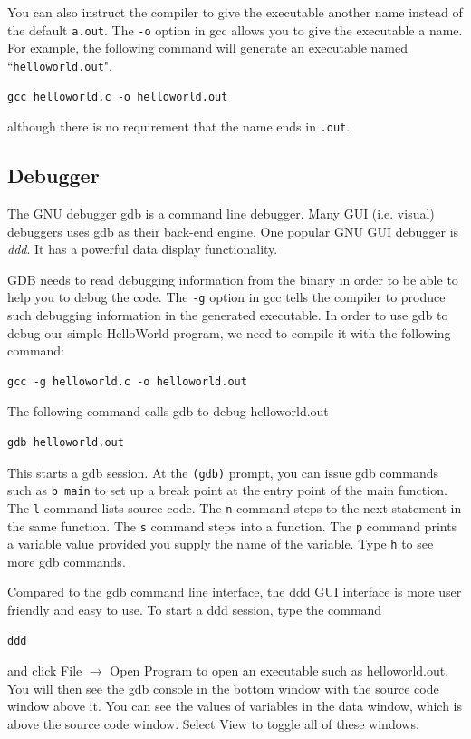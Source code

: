 You can also instruct the compiler to give the executable another name instead of the default \verb+a.out+. The \verb+-o+ option in gcc allows you to give the executable a name. For example, the following command will generate an executable named ``\verb+helloworld.out+".
\begin{lstlisting}[style=bash]
gcc helloworld.c -o helloworld.out
\end{lstlisting}
although there is no requirement that the name ends in \verb+.out+.
\subsection{Debugger}
The GNU debugger gdb is a command line debugger. Many GUI (i.e. visual)  debuggers uses gdb as their back-end engine. One popular GNU GUI debugger is {\em ddd}. It has a powerful data display functionality. 

GDB needs to read debugging information from the binary in order to be able to help you to debug the code. The \verb+-g+ option in gcc tells the compiler to produce such debugging information in the generated executable. In order to use gdb to debug our simple HelloWorld program, we need to compile it with the following command:
\begin{lstlisting}[style=bash]
gcc -g helloworld.c -o helloworld.out
\end{lstlisting}

The following command calls gdb to debug helloworld.out 
\begin{lstlisting}[style=bash]
gdb helloworld.out 
\end{lstlisting}
This starts a gdb session. At the \verb+(gdb)+ prompt, you can issue gdb commands such as \verb+b main+ to set up a break point at the entry point of the main function. The \verb+l+ command lists source code. The \verb+n+ command steps to the next statement in the same function. The \verb+s+ command steps into a function. The \verb+p+ command prints a variable value provided you supply the name of the variable. Type \verb+h+ to see more gdb commands.


Compared to the gdb command line interface, the ddd GUI interface is more user friendly and easy to use. To start a ddd session,
type the command
\begin{lstlisting}[style=bash]
ddd 
\end{lstlisting}
and click File $\rightarrow$ Open Program to open an executable such as helloworld.out. You will then see the gdb console in the bottom window with the source code window above it. You can see the values of variables in the data window, which is above the source code window. Select View to toggle all of these windows. 

